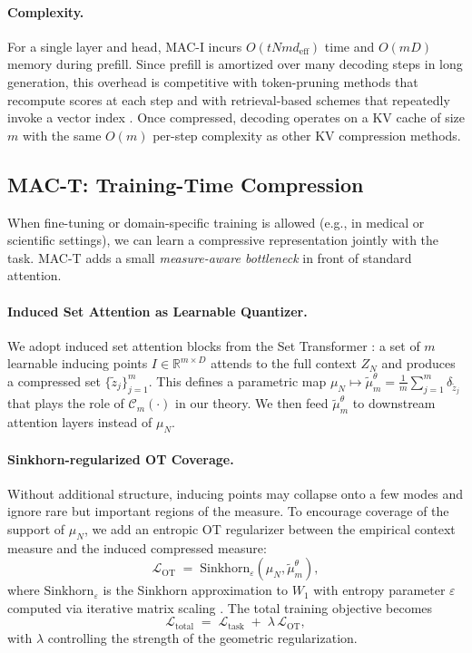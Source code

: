 \documentclass{article}
\theoremstyle{plain}
\theoremstyle{definition}
\theoremstyle{remark}
\newcommand{\R}{\mathbb{R}}
\newcommand{\muN}{\mu_N} %
\newcommand{\Wass}[1]{W_{#1}} %
\newcommand{\Compress}{\mathcal{C}_m} %
\begin{document}
\paragraph{Complexity.}
For a single layer and head, MAC-I incurs $O(t N m d_{\text{eff}})$ time and $O(mD)$
memory during prefill. Since prefill is amortized over many decoding steps in long
generation, this overhead is competitive with token-pruning methods that recompute
scores at each step \citep{zhang2024h2o,liu2024scissorhands,li2024snapkv} and with
retrieval-based schemes that repeatedly invoke a vector index
\citep{tang2024quest,gao2024retrieval}. Once compressed, decoding operates on a KV
cache of size $m$ with the same $O(m)$ per-step complexity as other KV compression
methods.

\subsection{MAC-T: Training-Time Compression}
\label{sec:method_training}

When fine-tuning or domain-specific training is allowed (e.g., in medical or scientific
settings), we can learn a compressive representation jointly with the task. MAC-T adds a
small \emph{measure-aware bottleneck} in front of standard attention.

\paragraph{Induced Set Attention as Learnable Quantizer.}
We adopt induced set attention blocks from the Set Transformer
\citep{lee2019set}: a set of $m$ learnable inducing points
$I \in \R^{m \times D}$ attends to the full context $Z_N$ and produces a compressed set
$\{\tilde{z}_j\}_{j=1}^m$. This defines a parametric map
$\muN \mapsto \tilde\mu_m^\theta = \frac{1}{m}\sum_{j=1}^m \delta_{\tilde{z}_j}$ that
plays the role of $\Compress(\cdot)$ in our theory. We then feed $\tilde\mu_m^\theta$ to
downstream attention layers instead of $\muN$.

\paragraph{Sinkhorn-regularized OT Coverage.}
Without additional structure, inducing points may collapse onto a few modes and ignore
rare but important regions of the measure. To encourage coverage of the support of
$\muN$, we add an entropic OT regularizer between the empirical context measure and the
induced compressed measure:
\begin{equation}
    \mathcal{L}_{\text{OT}}
    \;=\;
    \text{Sinkhorn}_\varepsilon(\muN, \tilde\mu_m^\theta),
\end{equation}
where $\text{Sinkhorn}_\varepsilon$ is the Sinkhorn approximation to $\Wass{1}$ with
entropy parameter $\varepsilon$ computed via iterative matrix scaling
\citep{cuturi2013sinkhorn}. The total training objective becomes
\begin{equation}
    \mathcal{L}_{\text{total}}
    \;=\;
    \mathcal{L}_{\text{task}}
    \;+\;
    \lambda \, \mathcal{L}_{\text{OT}},
\end{equation}
with $\lambda$ controlling the strength of the geometric regularization.
\end{document}
